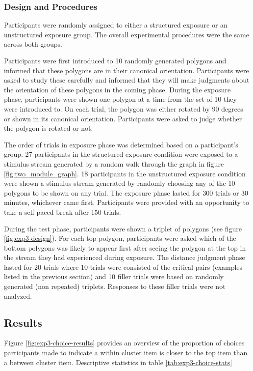 \subsubsection*{Design and Procedures}
Participants were randomly assigned to either a structured exposure or an unstructured exposure group. The overall experimental procedures were the same across both groups. 

Participants were first introduced to 10 randomly generated polygons and informed that these polygons are in their canonical orientation. Participants were asked to study these carefully and informed that they will make judgments about the orientation of these polygons in the coming phase. During the exposure phase, participants were shown one polygon at a time from the set of 10 they were introduced to. On each trial, the polygon was either rotated by 90 degrees or shown in its canonical orientation. Participants were asked to judge whether the polygon is rotated or not. 

The order of trials in exposure phase was determined based on a participant's group. 27 participants in the structured exposure condition were exposed to a stimulus stream generated by a random walk through the graph in figure \ref{fig:two_module_graph}. 18 participants in the unstructured exposure condition were shown a stimulus stream generated by randomly choosing any of the 10 polygons to be shown on any trial. The exposure phase lasted for 300 trials or 30 minutes, whichever came first. Participants were provided with an opportunity to take a self-paced break after 150 trials. 

During the test phase, participants were shown a triplet of polygons (see figure \ref{fig:exp3-design}). For each top polygon, participants were asked which of the bottom polygons was likely to appear first after seeing the polygon at the top in the stream they had experienced during exposure. The distance judgment phase lasted for 20 trials where 10 trials were consisted of the critical pairs (examples listed in the previous section) and 10 filler trials were based on randomly generated (non repeated) triplets. Responses to these filler trials were not analyzed.

\subsection{Results}

Figure \ref{fig:exp3-choice-results} provides an overview of the proportion of choices participants made to indicate a within cluster item is closer to the top item than a between cluster item. Descriptive statistics in table \ref{tab:exp3-choice-stats}

